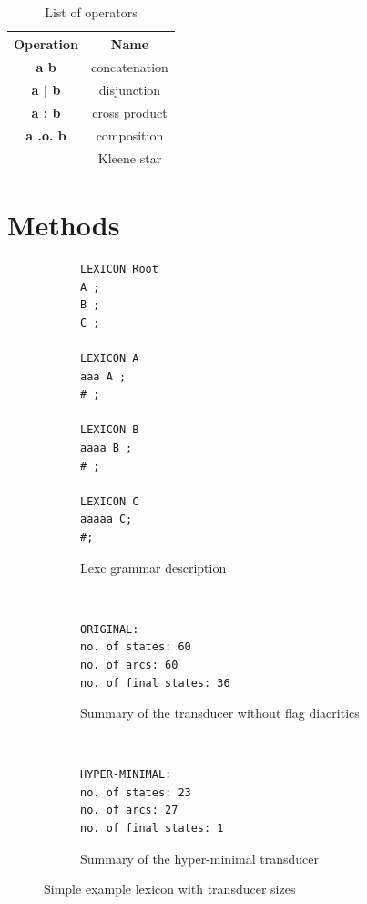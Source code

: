 \documentclass[11pt]{article}
\begin{document}
\begin{table}[h]
    \centering
    \begin{tabular}{|c|c|}
        \hline
        \bf Operation & \bf Name \\
        \hline\hline
        \bf a b & concatenation  \\
        \bf a | b & disjunction  \\
        \bf a : b & cross product  \\
        \bf a .o. b & composition  \\
        \bf * & Kleene star  \\
        

        \hline
    \end{tabular}
    \caption{List of operators
    \label{table:operators}}
\end{table}




\section{Methods}
\label{sec:methods}


\begin{figure}[htbp]
    \centering

\begin{subfigure}[t]{0.3\textwidth}
\begin{verbatim}
LEXICON Root
A ;
B ;
C ;

LEXICON A
aaa A ;
# ;

LEXICON B
aaaa B ;
# ;

LEXICON C
aaaaa C;
#;
\end{verbatim}
\caption{Lexc grammar description
\label{fig:lexc-a2}}
\end{subfigure}
 ~ %
\begin{subfigure}[t]{0.3\textwidth}
\begin{verbatim}
ORIGINAL:
no. of states: 60
no. of arcs: 60
no. of final states: 36
\end{verbatim}
\caption{Summary of the transducer without flag diacritics
\label{fig:sizes-orig}}
\end{subfigure}%
 ~ %
\begin{subfigure}[t]{0.3\textwidth}
\begin{verbatim}
HYPER-MINIMAL:
no. of states: 23
no. of arcs: 27
no. of final states: 1
\end{verbatim}
\caption{Summary of the hyper-minimal transducer
\label{fig:sizes-flags}}
 \end{subfigure}

 \caption{Simple example lexicon with transducer sizes}
 \label{fig:simple-ex}
\end{figure}
\end{document}
